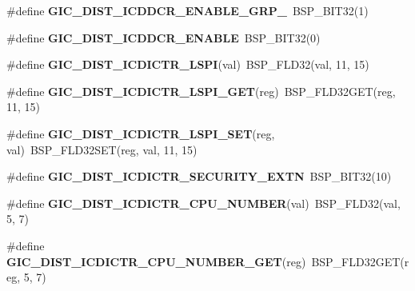 \begin{DoxyCompactItemize}
\item 
\mbox{\label{arm-gic-regs_8h_a11ac87156a6fa61d7762559c27765db9}} 
\#define {\bfseries G\+I\+C\+\_\+\+D\+I\+S\+T\+\_\+\+I\+C\+D\+D\+C\+R\+\_\+\+E\+N\+A\+B\+L\+E\+\_\+\+G\+R\+P\+\_}~B\+S\+P\+\_\+\+B\+I\+T32(1)
\item 
\mbox{\label{arm-gic-regs_8h_a4e712ec85d2d8ed69e65477a0de2ccc8}} 
\#define {\bfseries G\+I\+C\+\_\+\+D\+I\+S\+T\+\_\+\+I\+C\+D\+D\+C\+R\+\_\+\+E\+N\+A\+B\+LE}~B\+S\+P\+\_\+\+B\+I\+T32(0)
\item 
\mbox{\label{arm-gic-regs_8h_a6f1c31da49b1a18ca38c5c01d8691abd}} 
\#define {\bfseries G\+I\+C\+\_\+\+D\+I\+S\+T\+\_\+\+I\+C\+D\+I\+C\+T\+R\+\_\+\+L\+S\+PI}(val)~B\+S\+P\+\_\+\+F\+L\+D32(val, 11, 15)
\item 
\mbox{\label{arm-gic-regs_8h_ab6c061fcecba12dd52c7ed383be38665}} 
\#define {\bfseries G\+I\+C\+\_\+\+D\+I\+S\+T\+\_\+\+I\+C\+D\+I\+C\+T\+R\+\_\+\+L\+S\+P\+I\+\_\+\+G\+ET}(reg)~B\+S\+P\+\_\+\+F\+L\+D32\+G\+ET(reg, 11, 15)
\item 
\mbox{\label{arm-gic-regs_8h_a8a1480b2cd1383c4235e3c4841a051d4}} 
\#define {\bfseries G\+I\+C\+\_\+\+D\+I\+S\+T\+\_\+\+I\+C\+D\+I\+C\+T\+R\+\_\+\+L\+S\+P\+I\+\_\+\+S\+ET}(reg,  val)~B\+S\+P\+\_\+\+F\+L\+D32\+S\+ET(reg, val, 11, 15)
\item 
\mbox{\label{arm-gic-regs_8h_ab4a0203a07c6bf7c395a4ceabb6c85e9}} 
\#define {\bfseries G\+I\+C\+\_\+\+D\+I\+S\+T\+\_\+\+I\+C\+D\+I\+C\+T\+R\+\_\+\+S\+E\+C\+U\+R\+I\+T\+Y\+\_\+\+E\+X\+TN}~B\+S\+P\+\_\+\+B\+I\+T32(10)
\item 
\mbox{\label{arm-gic-regs_8h_a3718cdcf8be0d9f89102451d428d60ed}} 
\#define {\bfseries G\+I\+C\+\_\+\+D\+I\+S\+T\+\_\+\+I\+C\+D\+I\+C\+T\+R\+\_\+\+C\+P\+U\+\_\+\+N\+U\+M\+B\+ER}(val)~B\+S\+P\+\_\+\+F\+L\+D32(val, 5, 7)
\item 
\mbox{\label{arm-gic-regs_8h_a8005839b32ecf131c45f83ea25813cb4}} 
\#define {\bfseries G\+I\+C\+\_\+\+D\+I\+S\+T\+\_\+\+I\+C\+D\+I\+C\+T\+R\+\_\+\+C\+P\+U\+\_\+\+N\+U\+M\+B\+E\+R\+\_\+\+G\+ET}(reg)~B\+S\+P\+\_\+\+F\+L\+D32\+G\+ET(reg, 5, 7)

\end{DoxyCompactItemize}
